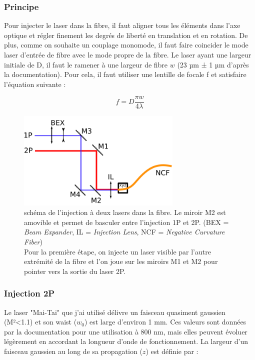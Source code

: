 \subsubsection{Principe}

Pour injecter le laser dans la fibre, il faut aligner tous les éléments dans l'axe optique et régler finement les degrés de liberté en translation et en rotation. De plus, comme on souhaite un couplage monomode, il faut faire coincider le mode laser d'entrée de fibre avec le mode propre de la fibre. Le laser ayant une largeur initiale de D, il faut le ramener à une largeur de fibre $w$ (23 µm ± 1 µm d'après la documentation). Pour cela, il faut utiliser une lentille de focale f et satisfaire l'équation suivante :

$$
f = D\frac{\pi w}{4\lambda}
$$

\begin{figure}
\centering
\includegraphics[width=0.7\textwidth]{./files/injection.svg.png}
\caption{schéma de l'injection à deux lasers dans la fibre. Le miroir M2 est amovible et permet de basculer entre l'injection 1P et 2P. (BEX = \emph{Beam Expander}, IL = \emph{Injection Lens}, NCF = \emph{Negative Curvature Fiber})
\\ Pour la première étape, on injecte un laser visible par l'autre extrémité de la fibre et l'on joue sur les miroirs M1 et M2 pour pointer vers la sortie du laser 2P.
\label{FIGinjection}}
\end{figure}

\subsubsection{Injection 2P}

Le laser "Mai-Tai" que j'ai utilisé délivre un faisceau quasiment gaussien (M²<1.1) et son waist ($w_0$) est large d'environ 1 mm. Ces valeurs sont données par la documentation pour une utilisation à 800 nm, mais elles peuvent évoluer légèrement en accordant la longueur d'onde de fonctionnement. La largeur d'un faisceau gaussien au long de sa propagation ($z$) est définie par :

